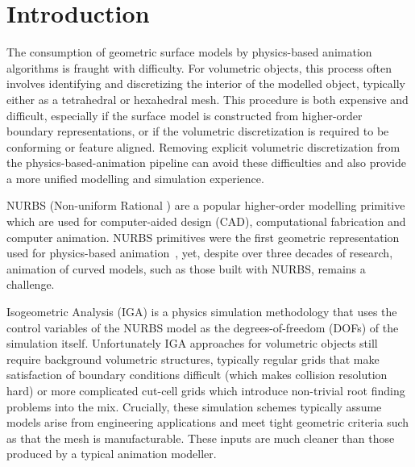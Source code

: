 \section{Introduction}

The consumption of geometric surface models by physics-based animation algorithms is fraught with difficulty. 
For volumetric objects, this process often involves identifying and discretizing the interior of the modelled object, 
typically either as a tetrahedral or hexahedral mesh. 
This procedure is both expensive and difficult, especially if the surface model is constructed from higher-order boundary
representations, or if the volumetric discretization is required to be conforming or feature aligned. 
Removing explicit volumetric discretization from the physics-based-animation pipeline can avoid these difficulties and 
also provide a more unified modelling and simulation experience. 

NURBS (Non-uniform Rational ) are a popular higher-order modelling primitive which 
are used for computer-aided design (CAD), computational fabrication and computer animation. 
NURBS primitives were the first geometric representation used for physics-based animation~\cite{10.1145/37402.37427}, yet,
despite over three decades of research, animation of curved models, such as those built with NURBS, remains a challenge.

Isogeometric Analysis (IGA) is a physics simulation methodology that uses the control variables of the NURBS model
as the degrees-of-freedom (DOFs) of the simulation itself. 
Unfortunately IGA approaches for volumetric objects still require background volumetric structures, typically
regular grids that make satisfaction of boundary conditions difficult (which makes collision resolution hard)
or more complicated cut-cell grids which introduce non-trivial root finding problems into the mix. 
Crucially, these simulation schemes typically assume models arise from engineering applications and meet tight geometric
criteria such as that the mesh is manufacturable. 
These inputs are much cleaner than those produced by a typical animation modeller. 


